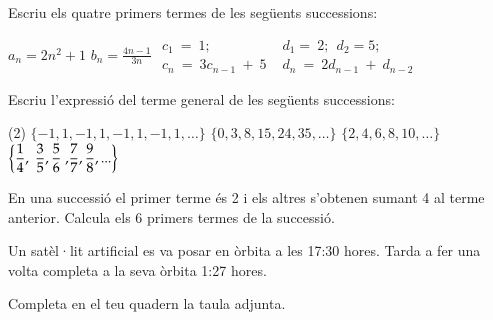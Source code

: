 \begin{mylist}

\exer  Escriu els quatre primers termes de les següents successions: 

 $a_n = 2 n^2+1$  \quad \quad  $b_n = \frac{4n-1}{3n}$ \quad \quad
 $ \begin{array}{c}
c_1\ =\ 1; \\ 
c_n\ =\ 3c_{n-1}\ +\ 5 \end{array}
$
\quad \quad
$\begin{array}{c}
d_1=\ 2;\ \ d_2=5; \\ 
d_n\ =\ 2d_{n-1}\ +\ d_{n-2} \end{array}$
 
 \answers[cols=1]{[$a_n=3,9,19,33,\cdots$, $b_n=1,\frac{7}{6},\frac{11}{9},\frac{5}{4},\cdots$, $c_n=1,8,29,92,\cdots$, $d_n=2,5,12,29,\cdots$]}


\exer  Escriu l'expressió del terme general de les següents successions:

\begin{tasks}(2) 
	\task  $\{-1, 1, -1, 1, -1, 1, -1, 1, {\dots}\}$      
	\task  $\{0, 3, 8, 15, 24, 35,{\dots}\}$  
	\task  $\{2, 4, 6, 8, 10,{\dots}\}$       
	\task  $\left\{\frac{1}{4} ,{\rm \; }\frac{3}{5} ,\frac{5}{6} {\rm \; ,}\frac{{\rm 7}}{{\rm 7}} ,\frac{9}{8} ,...\right\}$
\end{tasks}

\answers[cols=2]{[$a_n=(-1)^{n}$, $a_n=n^2-1$, $a_n=2\cdot n$, $a_n=\frac{2\cdot n-1}{3+n}$]}
 
\exer \spen  En una successió el primer terme és 2 i els altres s'obtenen sumant 4 al terme anterior. Calcula els 6 primers termes de la successió.
\vsoo
{}

\exer  Un satèl·lit artificial es va posar en òrbita a les 17:30 hores. Tarda a fer una volta completa a la seva òrbita 1:27 hores.

\begin{minipage}{0.84\textwidth}
\begin{tasks}
\task Completa en el teu quadern la taula adjunta.


\end{tasks}
\end{minipage}
\end{mylist}
